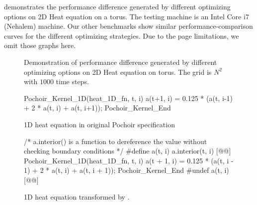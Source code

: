 
 
 demonstrates the performance difference generated by
different optimizing options on 2D Heat equation on a torus.  The
testing machine is an Intel Core i7 (Nehalem) machine.  Our other
benchmarks show similar performance-comparison curves for the
different optimizing strategies.  Due to the page limitations, we omit
those graphs here.


\begin{figure}[t]
\centering


\caption{Demonstration of performance difference generated by
  different optimizing options on 2D Heat equation on torus.  The grid
  is $N^2$ with $1000$ time steps.}
\label{fig:optPerf}
\end{figure}

\begin{figure}[t]
\begin{center-code}
\lstset{language=Pochoir_bf}
\begin{pochoir-listing}
Pochoir_Kernel_1D(heat_1D_fn, t, i)
   a(t+1, i) = 0.125 * (a(t, i-1) + 2 * a(t, i) + a(t, i+1));
Pochoir_Kernel_End
\end{pochoir-listing}
\end{center-code}
\caption{1D heat equation in original Pochoir specification}
\label{fig:1DHeat-orig}
\end{figure}

\begin{figure}[t]
\begin{center-code}
\lstset{language=Pochoir_bf}
\begin{pochoir-listing}
/* a.interior() is a function to dereference the value without checking boundary conditions */
#define a(t, i) a.interior(t, i) [@\label{li:macro:def}@]
Pochoir_Kernel_1D(heat_1D_fn, t, i)
   a(t + 1, i) = 0.125 * (a(t, i - 1) + 2 * a(t, i) + a(t, i + 1));
Pochoir_Kernel_End
#undef a(t, i) [@\label{li:macro:undef}@]
\end{pochoir-listing}
\end{center-code}
\caption{1D heat equation transformed by .}
\label{fig:1DHeat-macro}
\end{figure}

